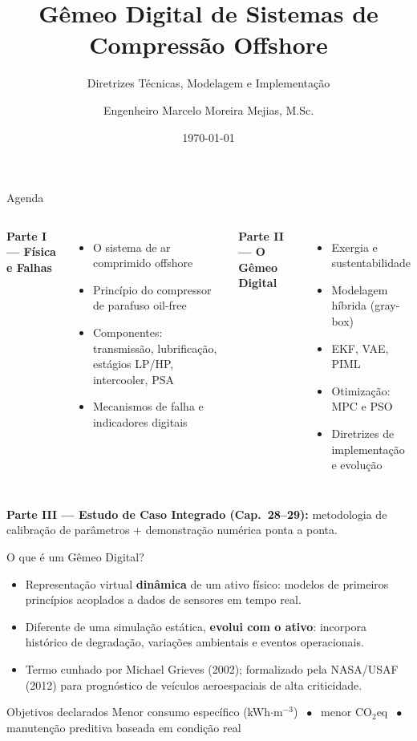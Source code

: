 \documentclass[aspectratio=169,12pt]{beamer}
\title{Gêmeo Digital de Sistemas de Compressão Offshore}
\subtitle{Diretrizes Técnicas, Modelagem e Implementação}
\author{Engenheiro Marcelo Moreira Mejias, M.Sc.}
\date{\today}
\begin{document}
\maketitle

\begin{frame}{Agenda}
	\begin{columns}[T]
		\textbf{Parte I — Física e Falhas}
		\begin{itemize}
			\item O sistema de ar comprimido offshore
			\item Princípio do compressor de parafuso oil-free
			\item Componentes: transmissão, lubrificação, estágios LP/HP, intercooler, PSA
			\item Mecanismos de falha e indicadores digitais
		\end{itemize}
		\textbf{Parte II — O Gêmeo Digital}
		\begin{itemize}
			\item Exergia e sustentabilidade
			\item Modelagem híbrida (gray-box)
			\item EKF, VAE, PIML
			\item Otimização: MPC e PSO
			\item Diretrizes de implementação e evolução
		\end{itemize}
	\end{columns}
	\vspace{0.5em}
	\textbf{Parte III — Estudo de Caso Integrado (Cap.\ 28--29):} metodologia de calibração de parâmetros + demonstração numérica ponta a ponta.
\end{frame}

\begin{frame}{O que é um Gêmeo Digital?}
	\begin{itemize}
		\item Representação virtual \textbf{dinâmica} de um ativo físico: modelos de primeiros princípios acoplados a dados de sensores em tempo real.
		\item Diferente de uma simulação estática, \textbf{evolui com o ativo}: incorpora histórico de degradação, variações ambientais e eventos operacionais.
		\item Termo cunhado por Michael Grieves (2002); formalizado pela NASA/USAF (2012) para prognóstico de veículos aeroespaciais de alta criticidade.
	\end{itemize}
	\vfill
	\begin{alertblock}{Objetivos declarados}
		Menor consumo específico (kWh$\cdot$m$^{-3}$) $\;\bullet\;$ menor CO$_2$eq $\;\bullet\;$ manutenção preditiva baseada em condição real
	\end{alertblock}
\end{frame}
\end{document}
